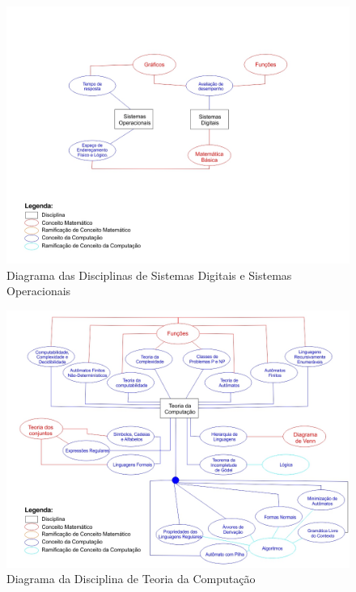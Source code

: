 \documentclass[12pt,a4paper]{article}
\begin{document}
\begin{figure}[!h]
	\centering
	\includegraphics[scale=0.5]{imagens/Diagrama Sistemas Digitais e Operacionais.jpg} 
	\caption{Diagrama das Disciplinas de Sistemas Digitais e Sistemas Operacionais}
\end{figure}

\begin{figure}[!h]
	\centering
	\includegraphics[scale=0.5]{imagens/Diagrama Teoria da Computacao.jpg} 
	\caption{Diagrama da Disciplina de Teoria da Computação}
\end{figure}
\end{document}
